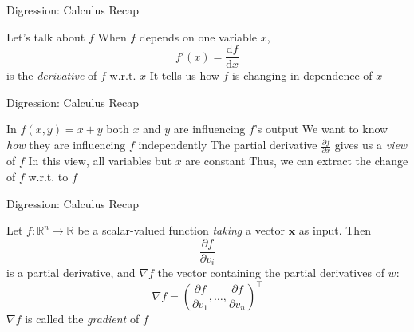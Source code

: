 \begin{slide}{Digression: Calculus Recap}
  \begin{itemize}
    \pitem Let's talk about $f$
    \pitem When $f$ depends on one variable $x$, $$f'(x) = \frac{\mathrm{d}f}{\mathrm{d}x}$$ is the \emph{derivative} of $f$ w.r.t. $x$
    \pitem It tells us how $f$ is changing in dependence of $x$
  \end{itemize}
\end{slide}

\begin{slide}{Digression: Calculus Recap}
  \begin{itemize}
    \pitem In $f(x, y) = x + y$ both $x$ and $y$ are influencing $f$'s output
    \pitem We want to know \emph{how} they are influencing $f$ independently
    \pitem The partial derivative $\frac{\partial f}{\partial x}$ gives us a \emph{view} of $f$
    \pitem In this view, all variables but $x$ are constant %
    \pitem Thus, we can extract the change of $f$ w.r.t. to $f$
  \end{itemize}
\end{slide}

\begin{slide}{Digression: Calculus Recap}
  \begin{itemize}
    \pitem Let $f: \mathbb{R}^n \rightarrow \mathbb{R}$ be a scalar-valued function \emph{taking} a vector $\mathbf{x}$ as input.
    \pitem Then $$\frac{\partial f}{\partial v_i}$$ is a partial derivative, and
    \pitem $\nabla f$ the vector containing the partial derivatives of $w$: $$\nabla f = \left(\frac{\partial f}{\partial v_1}, \dots, \frac{\partial f}{\partial v_n}\right)^\top$$
    \pitem $\nabla f$ is called the \emph{gradient} of $f$
  \end{itemize}
\end{slide}


